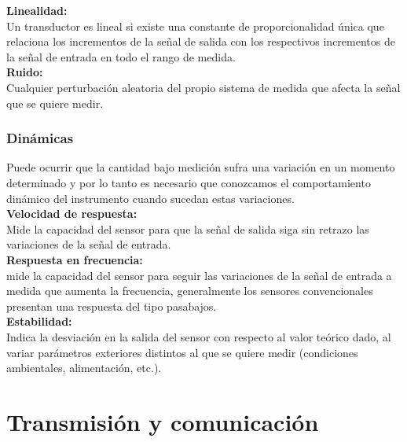 \textbf{Linealidad:}\\

Un  transductor  es  lineal  si  existe  una  constante  de  proporcionalidad  única 
que relaciona los incrementos de la señal de salida con los respectivos incrementos de la 
señal de entrada en todo el rango de medida. \\

\textbf{Ruido:}\\

Cualquier perturbación aleatoria del propio sistema de medida que afecta la señal 
que se quiere medir. \\

\subsubsection{Dinámicas}

Puede ocurrir que la cantidad bajo medición sufra una variación en un momento determinado y por lo tanto es necesario que conozcamos el comportamiento dinámico del instrumento 
cuando sucedan estas variaciones.\\

\textbf{Velocidad de respuesta:}\\

Mide la capacidad del sensor para que la señal de salida siga sin 
retrazo las variaciones de la señal de entrada. \\

\textbf{Respuesta en frecuencia:}\\

 mide la capacidad del sensor para seguir las variaciones de la 
señal  de  entrada  a  medida  que  aumenta  la  frecuencia,  generalmente  los  sensores 
convencionales presentan una respuesta del tipo pasabajos.\\

\textbf{Estabilidad:}\\

Indica  la  desviación  en  la  salida  del  sensor  con  respecto  al  valor  teórico 
dado,  al  variar  parámetros  exteriores  distintos  al  que  se  quiere  medir  (condiciones 
ambientales, alimentación, etc.). \\


\section{Transmisión y comunicación}
\label{sec:transmisión}

